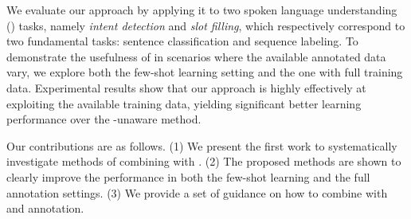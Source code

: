 %
We evaluate our approach by applying it to two spoken language understanding (\SLU) tasks, namely \emph{intent detection} and \emph{slot
filling}, which respectively correspond to two fundamental \NLP tasks: sentence classification and sequence labeling. To demonstrate the
usefulness of \REs in scenarios where the available annotated data vary, we explore both the few-shot learning setting and the one with
full training data. Experimental results show that our approach is highly effectively at exploiting the available training data, yielding
significant better learning performance over the \RE-unaware method.




Our contributions are as follows. (1) We present the first work to systematically investigate methods of combining \REs with \NNs. (2) The
proposed methods are shown to clearly improve the \NN performance in both the few-shot learning and the full annotation settings. (3) We
provide a set of guidance on how to combine \REs with \NNs and \RE annotation.
